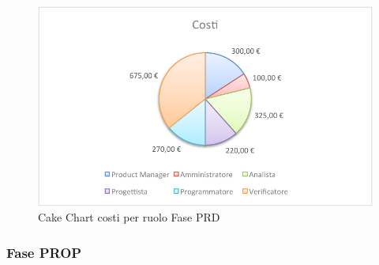 				\begin{figure}[H]\centering
					\includegraphics[width=\textwidth]{PianoDiProgetto/Pics/ChartTotCostiFasePRD.pdf}
					\caption{Cake Chart costi per ruolo Fase PRD}
				\end{figure}
		\subsubsection{Fase PROP}
